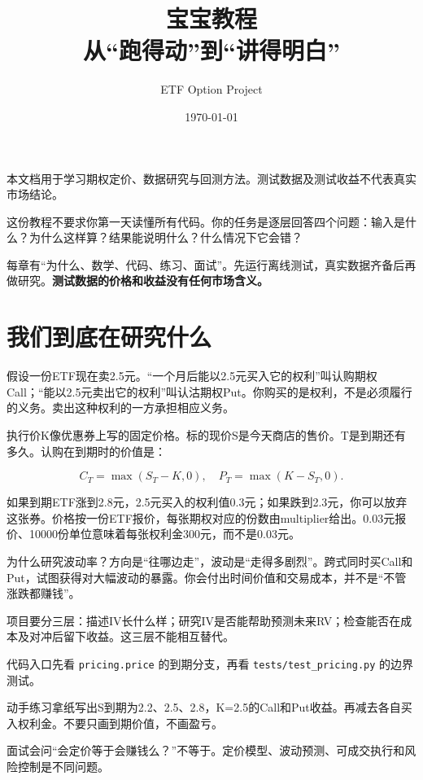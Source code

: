 \documentclass[UTF8,11pt,a4paper]{ctexart}
\title{\bfseries 宝宝教程\\[0.35em]\large 从“跑得动”到“讲得明白”}
\author{ETF Option Project}
\date{\today}
\begin{document}
\maketitle
\begin{center}
\small 本文档用于学习期权定价、数据研究与回测方法。测试数据及测试收益不代表真实市场结论。
\end{center}
\tableofcontents
\clearpage

这份教程不要求你第一天读懂所有代码。你的任务是逐层回答四个问题：输入是什么？为什么这样算？结果能说明什么？什么情况下它会错？

每章有“为什么、数学、代码、练习、面试”。先运行离线测试，真实数据齐备后再做研究。\textbf{测试数据的价格和收益没有任何市场含义。}


\section{我们到底在研究什么}

假设一份ETF现在卖2.5元。“一个月后能以2.5元买入它的权利”叫认购期权Call；“能以2.5元卖出它的权利”叫认沽期权Put。你购买的是权利，不是必须履行的义务。卖出这种权利的一方承担相应义务。

执行价K像优惠券上写的固定价格。标的现价S是今天商店的售价。T是到期还有多久。认购在到期时的价值是：

\[
C_T=\max(S_T-K,0),\quad P_T=\max(K-S_T,0).
\]

如果到期ETF涨到2.8元，2.5元买入的权利值0.3元；如果跌到2.3元，你可以放弃这张券。价格按一份ETF报价，每张期权对应的份数由multiplier给出。0.03元报价、10000份单位意味着每张权利金300元，而不是0.03元。

为什么研究波动率？方向是“往哪边走”，波动是“走得多剧烈”。跨式同时买Call和Put，试图获得对大幅波动的暴露。你会付出时间价值和交易成本，并不是“不管涨跌都赚钱”。

项目要分三层：描述IV长什么样；研究IV是否能帮助预测未来RV；检查能否在成本及对冲后留下收益。这三层不能相互替代。

\begin{learningbox}{代码入口}先看 \texttt{pricing.price} 的到期分支，再看 \texttt{tests/test\_pricing.py} 的边界测试。\end{learningbox}

\begin{learningbox}{动手练习}拿纸写出S到期为2.2、2.5、2.8，K=2.5的Call和Put收益。再减去各自买入权利金。不要只画到期价值，不画盈亏。\end{learningbox}

\begin{learningbox}{面试会问}“会定价等于会赚钱么？”不等于。定价模型、波动预测、可成交执行和风险控制是不同问题。\end{learningbox}
\end{document}
